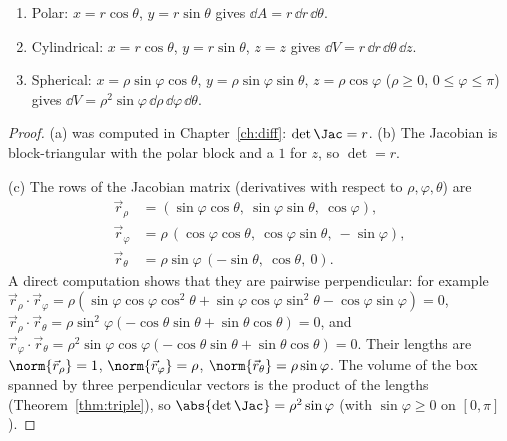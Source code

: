 \begin{theorem}\label{thm:elements}
\begin{enumerate}[label=(\alph*)]
  \item Polar: $x=r\cos\theta$, $y=r\sin\theta$ gives $\dd A=r\,\dd r\,\dd\theta$.
  \item Cylindrical: $x=r\cos\theta$, $y=r\sin\theta$, $z=z$ gives $\dd V=r\,\dd r\,\dd\theta\,\dd z$.
  \item Spherical: $x=\rho\sin\varphi\cos\theta$, $y=\rho\sin\varphi\sin\theta$, $z=\rho\cos\varphi$ ($\rho\ge0$, $0\le\varphi\le\pi$) gives $\dd V=\rho^2\sin\varphi\,\dd\rho\,\dd\varphi\,\dd\theta$.
\end{enumerate}
\end{theorem}

\begin{proof}
(a) was computed in Chapter~\ref{ch:diff}: $\det\Jac=r$. (b) The Jacobian is block-triangular with the polar block and a $1$ for $z$, so $\det=r$.

(c) The rows of the Jacobian matrix (derivatives with respect to $\rho,\varphi,\theta$) are
\begin{align*}
\vec r_\rho&=(\sin\varphi\cos\theta,\ \sin\varphi\sin\theta,\ \cos\varphi),\\
\vec r_\varphi&=\rho\,(\cos\varphi\cos\theta,\ \cos\varphi\sin\theta,\ -\sin\varphi),\\
\vec r_\theta&=\rho\sin\varphi\,(-\sin\theta,\ \cos\theta,\ 0).
\end{align*}
A direct computation shows that they are pairwise perpendicular: for example $\vec r_\rho\cdot\vec r_\varphi=\rho(\sin\varphi\cos\varphi\cos^2\theta+\sin\varphi\cos\varphi\sin^2\theta-\cos\varphi\sin\varphi)=0$, $\vec r_\rho\cdot\vec r_\theta=\rho\sin^2\varphi(-\cos\theta\sin\theta+\sin\theta\cos\theta)=0$, and $\vec r_\varphi\cdot\vec r_\theta=\rho^2\sin\varphi\cos\varphi(-\cos\theta\sin\theta+\sin\theta\cos\theta)=0$. Their lengths are $\norm{\vec r_\rho}=1$, $\norm{\vec r_\varphi}=\rho$, $\norm{\vec r_\theta}=\rho\sin\varphi$. The volume of the box spanned by three perpendicular vectors is the product of the lengths (Theorem~\ref{thm:triple}), so $\abs{\det\Jac}=\rho^2\sin\varphi$ (with $\sin\varphi\ge0$ on $[0,\pi]$).
\end{proof}

